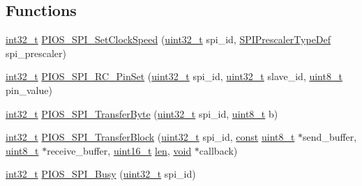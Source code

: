 \subsection*{Functions}
\begin{DoxyCompactItemize}
\item 
\hyperlink{group___n_a_m_e_gafd12020da5a235dfcf0c3c748fb5baed}{int32\-\_\-t} \hyperlink{group___p_i_o_s___s_p_i_ga5e8329c2d8543fe240f50571bf87eb22}{P\-I\-O\-S\-\_\-\-S\-P\-I\-\_\-\-Set\-Clock\-Speed} (\hyperlink{stdint_8h_a435d1572bf3f880d55459d9805097f62}{uint32\-\_\-t} spi\-\_\-id, \hyperlink{group___p_i_o_s___s_p_i_gacc2b1ca1c7cd8aeef04fee955ef7ffd2}{S\-P\-I\-Prescaler\-Type\-Def} spi\-\_\-prescaler)
\item 
\hyperlink{group___n_a_m_e_gafd12020da5a235dfcf0c3c748fb5baed}{int32\-\_\-t} \hyperlink{group___p_i_o_s___s_p_i_gaae1c8b2fa4574c575994c1fd591233a6}{P\-I\-O\-S\-\_\-\-S\-P\-I\-\_\-\-R\-C\-\_\-\-Pin\-Set} (\hyperlink{stdint_8h_a435d1572bf3f880d55459d9805097f62}{uint32\-\_\-t} spi\-\_\-id, \hyperlink{stdint_8h_a435d1572bf3f880d55459d9805097f62}{uint32\-\_\-t} slave\-\_\-id, \hyperlink{stdint_8h_aba7bc1797add20fe3efdf37ced1182c5}{uint8\-\_\-t} pin\-\_\-value)
\item 
\hyperlink{group___n_a_m_e_gafd12020da5a235dfcf0c3c748fb5baed}{int32\-\_\-t} \hyperlink{group___p_i_o_s___s_p_i_gaa65b0b0a89e87c3e8f13c00ee0b91563}{P\-I\-O\-S\-\_\-\-S\-P\-I\-\_\-\-Transfer\-Byte} (\hyperlink{stdint_8h_a435d1572bf3f880d55459d9805097f62}{uint32\-\_\-t} spi\-\_\-id, \hyperlink{stdint_8h_aba7bc1797add20fe3efdf37ced1182c5}{uint8\-\_\-t} b)
\item 
\hyperlink{group___n_a_m_e_gafd12020da5a235dfcf0c3c748fb5baed}{int32\-\_\-t} \hyperlink{group___p_i_o_s___s_p_i_ga7dc994b4889415502021540ebbd2fce3}{P\-I\-O\-S\-\_\-\-S\-P\-I\-\_\-\-Transfer\-Block} (\hyperlink{stdint_8h_a435d1572bf3f880d55459d9805097f62}{uint32\-\_\-t} spi\-\_\-id, \hyperlink{group___n_a_m_e_ga7ae6d0e43244213b34de2c2b9aa30da6}{const} \hyperlink{stdint_8h_aba7bc1797add20fe3efdf37ced1182c5}{uint8\-\_\-t} $\ast$send\-\_\-buffer, \hyperlink{stdint_8h_aba7bc1797add20fe3efdf37ced1182c5}{uint8\-\_\-t} $\ast$receive\-\_\-buffer, \hyperlink{stdint_8h_a273cf69d639a59973b6019625df33e30}{uint16\-\_\-t} \hyperlink{mavlink__helpers_8h_aba59486c1504340293255a065b546e3a}{len}, \hyperlink{group___n_a_m_e_ga18028b8badbf1ea7e704ccac3c488e82}{void} $\ast$callback)
\item 
\hyperlink{group___n_a_m_e_gafd12020da5a235dfcf0c3c748fb5baed}{int32\-\_\-t} \hyperlink{group___p_i_o_s___s_p_i_ga2c561c9f63706d774c1b5ed7df2e17f5}{P\-I\-O\-S\-\_\-\-S\-P\-I\-\_\-\-Busy} (\hyperlink{stdint_8h_a435d1572bf3f880d55459d9805097f62}{uint32\-\_\-t} spi\-\_\-id)

\end{DoxyCompactItemize}
